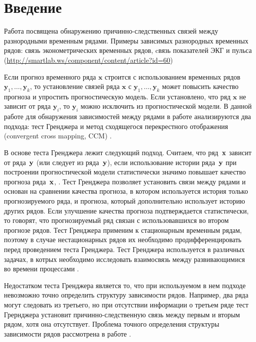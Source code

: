 \documentclass[14pt]{article}
\newcommand{\bx}{\mathbf{x}}
\newcommand{\by}{\mathbf{y}}
\begin{document}
\newpage
\tableofcontents

\newpage
\section{Введение}
Работа посвящена обнаружению причинно-следственных связей между разнородными временным рядами. 	
Примеры зависимых разнородных временных рядов:
связь эконометрических временных рядов, cвязь показателей ЭКГ и пульса (\url{http://smartlab.ws/component/content/article?id=60})

Если прогноз временного ряда $\bx$ строится с использованием временных рядов $\by_1, \ldots, \by_k$, то установление связей ряда $\bx$ с $\by_1, \ldots, \by_k$ может повысить качество прогноза и упростить прогностическую модель. 
Если установлено, что ряд $\bx$ не  зависит от ряда $\by_i$, то $\by_i$ можно исключить из прогностической модели.
В данной работе для обнаружения зависимостей между рядами в работе анализируются два подхода: тест Гренджера \cite{granger1969investigating, barrett2010multivariate} и метод сходящегося перекрестного отображения (convergent cross mapping, CCM) \cite{sugihara2012detecting, sugihara1990nonlinear}. 

В основе теста Гренджера лежит следующий подход.
Считаем, что ряд~${\bf x}$ зависит от ряда~${\bf y}$ (или следует из ряда~${\bf y}$), если использование истории ряда~${\bf y}$ при построении прогностической модели статистически значимо повышает качество прогноза ряда~${\bf x}$, \cite{granger1969investigating, barrett2010multivariate}.
Тест Гренджера позволяет установить связи между рядами и основан на сравнении качества прогноза, в котором используется история только прогнозируемого ряда, и прогноза, который дополнительно использует историю других рядов. Если улучшение качества прогноза подтверждается статистически, то говорят, что прогнозируемый ряд связан с использовавшихся во втором прогнозе рядов. 
Тест Гренджера  применим к стационарным временным рядам, поэтому в случае нестационарных рядов их необходимо продифференцировать перед проведением теста Гренджера.  
Тест Гренджера используется в различных задачах, в котрых необходимо исследовать взаимосвязь между развивающимися во времени процессами \cite{hiemstra1994testing, hoffmann2005fdi}.    

Недостатком теста Гренджера является то, что при используемом в нем подходе невозможно точно определить структуру зависимости рядов. Например, два ряда могут следовать из третьего, но при отсутствии информации о третьем ряде тест Грернджера установит причинно-следственную связь между первым и вторым рядом, хотя она отсутствует. Проблема точного определения структуры зависимости рядов рассмотрена в работе \cite{white2010granger}. 
\end{document}
